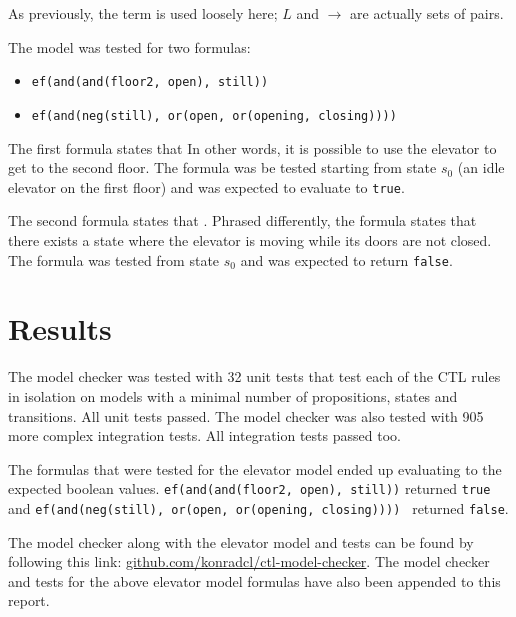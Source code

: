 \documentclass[a4paper, 11pt]{article}
\begin{document}
   As previously, the term  is used loosely
   here; $L$ and $\rightarrow$ are actually sets of pairs.
   \bigbreak

   The model was tested for two formulas: 
   \begin{itemize}
      \item \texttt{ef(and(and(floor2, open), still))}
      \item \texttt{ef(and(neg(still), or(open, or(opening,
         closing))))}
   \end{itemize}

   The first formula states that  In other words, it is
   possible to use the elevator to get to the second floor.
   The formula was be tested starting from state 
   $s_0$ (an idle elevator on the first floor) and was 
   expected to evaluate to \texttt{true}.
   \bigbreak

   The second formula states that .
   Phrased differently, the formula states that there exists
   a state where the elevator is moving while its doors are
   not closed. The formula was tested from state $s_0$ and
	was expected to return \texttt{false}.

   \section{Results}
   
   The model checker was tested with 32 unit tests that test
	each of the CTL rules in isolation on models with a minimal
	number of propositions, states and transitions. All unit
   tests passed. The model checker was also tested with 905
   more complex integration tests. All integration tests
   passed too.
   \bigbreak

   The formulas that were tested for the elevator model ended
   up evaluating to the expected boolean values.
   \texttt{ef(and(and(floor2, open), still))} returned
   \texttt{true} and 
   \texttt{ef(and(neg(still), or(open, or(opening, closing))))
   } returned \texttt{false}.
   \bigbreak

   The model checker along with the elevator model and tests 
   can be found by following this link:
   \url{github.com/konradcl/ctl-model-checker}. The
   model checker and tests for the above elevator model
   formulas have also been appended to this report.
\end{document}
